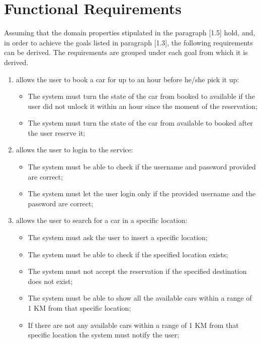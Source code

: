\section{Functional Requirements}
Assuming that the domain properties stipulated in the paragraph [1.5] hold, and, in order to achieve the goals listed in paragraph [1.3], the following requirements can be derived. The requirements are grouped under each goal from which it is derived.

\begin{enumerate}

\item allows the user to book a car for up to an hour before he/she pick it up:

\begin{itemize}
\item The system must turn the state of the car from booked to available if the user did not unlock it within an hour since the moment of the reservation;
\item The system must turn the state of the car from available to booked after the user reserve it;
\end{itemize}

\item allows the user to login to the service:

\begin{itemize}
\item The system must be able to check if the username and password provided are correct;
\item The system must let the user login only if the provided username and the password are correct;
\end{itemize}

\item allows the user to search for a car in a specific location:

\begin{itemize}
\item The system must ask the user to insert a specific location;
\item The system must be able to check if the specified location exists;
\item The system must not accept the reservation if the specified destination does not exist;
\item The system must be able to show all the available cars within a range of 1 KM from that specific location;
\item If there are not any available cars within a range of 1 KM from that specific location the system must notify the user;
\end{itemize}


\end{enumerate}
